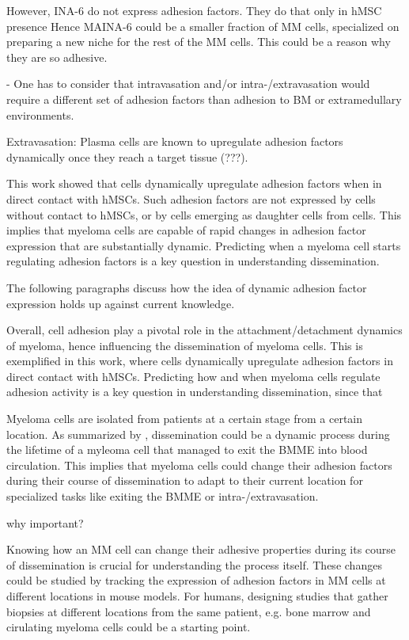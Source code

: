 However, INA-6 do not express adhesion factors. They do that only in hMSC presence
Hence MAINA-6 could be a smaller fraction of MM cells, specialized on preparing a new niche
for the rest of the MM cells. This could be a reason why they are so adhesive.

- One has to consider that intravasation and/or intra-/extravasation would require a different
set of adhesion factors than adhesion to BM or extramedullary environments.

Extravasation: Plasma cells are known to upregulate adhesion factors dynamically
once they reach a target tissue (???).

This work showed that \INA cells dynamically upregulate adhesion factors when in
direct contact with \acp{hMSC}. Such adhesion factors are not expressed by \INA
cells without contact to \acp{hMSC}, or by \INA cells emerging as daughter cells
from \MAina cells. This implies that myeloma cells are capable of rapid changes in
adhesion factor expression that are substantially dynamic.
Predicting when a myeloma cell starts regulating adhesion factors is a key
question in understanding dissemination.

The following paragraphs
discuss how the idea of dynamic adhesion factor expression holds up
against current knowledge.




Overall, cell adhesion play a pivotal role in the attachment/detachment dynamics of
myeloma, hence influencing the dissemination of myeloma cells. This is
exemplified in this work, where \INA cells dynamically upregulate adhesion
factors in direct contact with \acp{hMSC}. Predicting how and when myeloma cells
regulate adhesion activity is a key question in understanding dissemination,
since that

Myeloma cells are isolated from patients at a certain stage from a certain
location. As summarized by \citet{zeissigTumourDisseminationMultiple2020},
dissemination could be a dynamic process during the lifetime of a myleoma cell
that managed to exit the \ac{BMME} into blood circulation. This implies that
myeloma cells could change their adhesion factors during their course of
dissemination to adapt to their current location for specialized tasks like
exiting the \ac{BMME} or intra-/extravasation.

why important?

Knowing how an MM cell can change their adhesive properties during its course of
dissemination is crucial for understanding the process itself. These changes
could be studied by tracking the expression of adhesion factors in MM cells at
different locations in mouse models. For humans, designing studies that gather
biopsies at different locations from the same patient, e.g. bone marrow and cirulating
myeloma cells could be a starting point.

